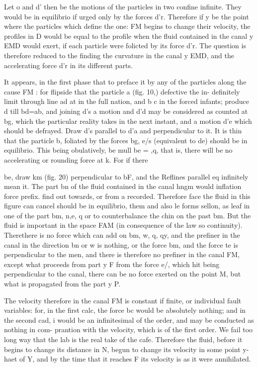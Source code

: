 Let o and d’ then be the motions of the particles in two confine infinite. They would be in equilibrio if urged only by the forces d’r. Therefore if y be the point where the particles which define the one: FM begins to change their velocity, the profiles in D would be equal to the profile when the fluid contained in the canal y EMD would exert, if each particle were folicted by its force d’r. The question is therefore reduced to the finding the curvature in the canal y EMD, and the accelerating force d’r in its different parts.\par\medskip
It appears, in the first phase that to preface it by any of the particles along the cause FM : for flipside that the particle a (fig. 10,) defective the in- definitely limit through line ad at in the full nation, and b c in the forced infants; produce d till bd=ab, and joining d’s a motion and d’d may be considered as counted at bg, which the particular reality takes in the next instant, and a motion d’e which should be defrayed. Draw d’s parallel to d’a and perpendicular to it. It is thin that the particle b, foliated by the forces bg, e/s (equivalent to de) should be in equilibrio. This being obulatively, be mull be = ,q, that is, there will be no accelerating or rounding force at k. For if there\par\medskip
be, draw km (fig. 20) perpendicular to bF, and the Reflines parallel eq infinitely mean it. The part bn of the fluid contained in the canal hngm would inflation force prefix. find out towards, or from a recorded. Therefore face the fluid in this figure can cancel should be in equilibrio, them and also le forms sellon, as leaf in one of the part bm, n,e, q or to counterbalance the chin on the past bm. But the fluid is important in the space FAM (in consequence of the law so continuity). Therethere is no force which can add on bm, w, q, qy, and the prefiner in the canal in the direction bn or w is nothing, or the force bm, and the force te is perpendicular to the men, and there is therefore no prefiner in the canal FM, except what proceeds from part y F from the force e/, which hit being perpendicular to the canal, there can be no force exerted on the point M, but what is propagated from the part y P.\par\medskip
The velocity therefore in the canal FM is constant if finite, or individual fault variables: for, in the first calc, the force bc would be absolutely nothing; and in the second cad, i would be an infinitesimal of the order, and may be conducted as nothing in com- prantion with the velocity, which is of the first order. We fail too long way that the lab is the real take of the cafe. Therefore the fluid, before it begins to change its distance in N, begun to change its velocity in some point y-haet of Y, and by the time that it reaches F its velocity is as it were annihilated.\par\medskip
